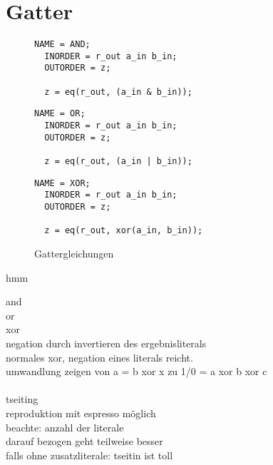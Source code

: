 \section{Gatter}
\label{sec:knf:gatter}

\begin{figure}[!h]
  \centering
  \begin{minipage}[c]{4.85cm}
    \begin{lstlisting}[]
  NAME = AND;
  INORDER = r_out a_in b_in;
  OUTORDER = z;

  z = eq(r_out, (a_in & b_in));
    \end{lstlisting}
  \end{minipage}
  \begin{minipage}[c]{4.85cm}
    \begin{lstlisting}[]
  NAME = OR;
  INORDER = r_out a_in b_in;
  OUTORDER = z;

  z = eq(r_out, (a_in | b_in));
    \end{lstlisting}
  \end{minipage}
  \begin{minipage}[c]{5.1cm}
    \begin{lstlisting}[]
  NAME = XOR;
  INORDER = r_out a_in b_in;
  OUTORDER = z;

  z = eq(r_out, xor(a_in, b_in));
    \end{lstlisting}
  \end{minipage}
  \caption{Gattergleichungen}
  \label{fig:gatter_equations}
\end{figure}

hmm

and\\
or\\
xor\\
negation durch invertieren des ergebnisliterals
~\\
normales xor, negation eines literals reicht.\\
umwandlung zeigen von a = b xor x zu 1/0 = a xor b xor c\\
~\\
tseiting\\
reproduktion mit espresso möglich
~\\
beachte: anzahl der literale\\
darauf bezogen geht teilweise besser\\
falls ohne zusatzliterale: tseitin ist toll\\